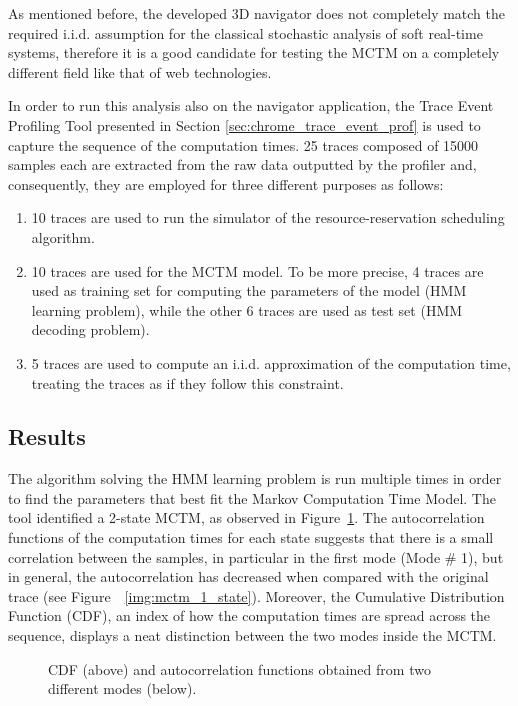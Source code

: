 As mentioned before, the developed 3D navigator does not completely match the required i.i.d. assumption for the classical stochastic analysis of soft real-time systems, therefore it is a good candidate for testing the MCTM on a completely different field like that of web technologies.

In order to run this analysis also on the navigator application, the Trace Event
Profiling Tool presented in Section \ref{sec:chrome_trace_event_prof} is used
to capture the sequence of the computation times. 25 traces composed of 15000
samples each are extracted from the raw data outputted by the profiler and,
consequently, they are employed for three different purposes as follows:
\begin{enumerate}
    \item 10 traces are used to run the simulator of the resource-reservation
        scheduling algorithm.
    \item 10 traces are used for the MCTM model. To be more precise, 4 traces are used as
        training set for computing the parameters of the model (HMM learning
        problem), while the other 6 traces are used as test set (HMM decoding problem).
    \item 5 traces are used to compute an i.i.d. approximation of the computation time,
        treating the traces as if they follow this constraint.
\end{enumerate}


\subsection{Results}\label{sec:mctm_results}
The algorithm solving the HMM learning problem is run multiple times in order to
find the parameters that best fit the Markov Computation Time Model. The tool identified a 2-state MCTM, as observed in Figure~\ref{img:mctm_2_states}. The autocorrelation
functions of the computation times for each state suggests that there is a small correlation between the samples, in particular in the first mode (Mode \# 1), but in general, the autocorrelation has decreased when compared with the original trace (see Figure~~\ref{img:mctm_1_state}).
Moreover, the Cumulative Distribution Function (CDF), an index of how the computation
times are spread across the sequence, displays a neat distinction between
the two modes inside the MCTM.
\begin{figure}[!htb]
    \caption{CDF (above) and autocorrelation functions obtained from two
        different modes (below).}
    \label{img:mctm_2_states}
\end{figure}

